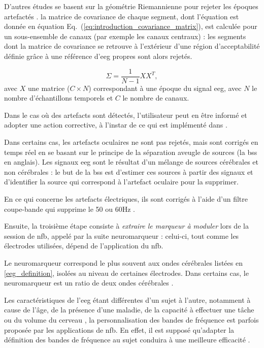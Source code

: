 D'autres études se basent sur la géométrie Riemannienne pour rejeter les époques artefactés \citep{Barthelemy2019, Bioulac2019}. 
la matrice de covariance de chaque segment, dont l'équation est donnée en équation Eq.~(\ref{eq:introduction_covariance_matrix}), est calculée pour un sous-ensemble de canaux (par exemple les canaux
centraux) : les segments dont la matrice de covariance se retrouve à l'extérieur d'une région d'acceptabilité définie grâce à une référence d'\gls{eeg} propres sont alors rejetés.

\begin{equation}
\label{eq:introduction_covariance_matrix}
\Sigma = \frac{1}{N - 1}XX^T,
\end{equation}
avec $X$ une matrice ($C \times N$) correspondant à une époque du signal \gls{eeg}, avec $N$ le nombre d'échantillons temporels et $C$ le nombre de canaux. 

Dans le cas où des artefacts sont détectés, l'utilisateur peut en être informé et adopter une action corrective, à l'instar de ce qui est implémenté dans 
\citet{Bioulac2019}.

Dans certains cas, les artefacts oculaires ne sont pas rejetés, mais sont corrigés en temps réel \citep{Barthelemy2017, Maurizio2014, Bioulac2019} en se basant sur
le principe de la séparation aveugle de sources (la \gls{bss} en anglais). Les signaux \gls{eeg} sont le résultat d'un mélange de sources cérébrales et non cérébrales : le but 
de la \gls{bss} est d'estimer ces sources à partir des signaux et d'identifier la source qui correspond à l'artefact oculaire pour la supprimer.

En ce qui concerne les artefacts électriques, ils sont corrigés à l'aide d'un filtre coupe-bande qui supprime le 50 ou 60Hz \citep{Bioulac2019}.

Ensuite, la troisième étape consiste à \emph{extraire le marqueur à moduler} lors de la session de \gls{nfb}, appelé par la suite neuromarqueur : 
celui-ci, tout comme les électrodes utilisées, dépend de l'application du \gls{nfb}. 

Le neuromarqueur correspond le plus souvent aux ondes cérébrales listées en \ref{eeg_definition}, isolées au 
niveau de certaines électrodes. Dans certains cas, le neuromarqueur est un ratio de deux ondes cérébrales \citep{Gevensleben2009}. 

Les caractéristiques de l'\gls{eeg} étant différentes d'un sujet à l'autre, notamment à cause de l'âge, de la présence d'une maladie, de la capacité à effectuer une tâche ou du volume 
du cerveau \citep{Enriquez2017, Klimesch1999, Moretti2004, Alkoby2017}, la personnalisation des bandes de fréquence est parfois proposée par les applications de \gls{nfb}. 
En effet, il est supposé qu'adapter la définition des bandes de fréquence au sujet conduira à une meilleure efficacité \citep{Enriquez2017}. 

